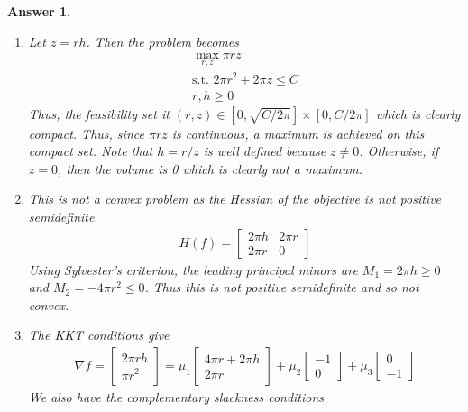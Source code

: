 \documentclass[12pt]{article}
\theoremstyle{colon}
\newtheorem*{answer}{Answer}
\begin{document}
\begin{answer}
  \leavevmode
  \begin{enumerate}[label=\arabic*)]
    \item Let $z=rh$. Then the problem becomes
      \begin{gather*}
        \max_{r,z} \pi r z \\
        \text{s.t. } 2 \pi r^2 + 2 \pi z \leq C \\
        r, h \geq 0
      \end{gather*}
      Thus, the feasibility set it $(r,z) \in [0, \sqrt{C/2 \pi}] \times [0, C/2 \pi]$ which is clearly compact. Thus, since $\pi r z$ is continuous, a maximum is achieved on this compact set. Note that $h = r/z$ is well defined because $z \neq 0$. Otherwise, if $z=0$, then the volume is 0 which is clearly not a maximum.
    \item This is not a convex problem as the Hessian of the objective is not positive semidefinite
      \begin{gather*}
        H(f) = \begin{bmatrix}
          2 \pi h & 2 \pi r \\
          2 \pi r & 0
        \end{bmatrix}
      \end{gather*}
      Using Sylvester's criterion, the leading principal minors are $M_1 = 2 \pi h \geq 0$ and $M_2 = -4 \pi r^2 \leq 0$. Thus this is not positive semidefinite and so not convex.
    \item The KKT conditions give
      \begin{gather*}
        \nabla f = \begin{bmatrix}
          2 \pi r h \\
          \pi r^2
        \end{bmatrix} = \mu_1 \begin{bmatrix}
          4 \pi r + 2 \pi h  \\
          2 \pi r
        \end{bmatrix} + \mu_2 \begin{bmatrix}
          -1  \\
          0
        \end{bmatrix} + \mu_3 \begin{bmatrix}
          0  \\
          -1
        \end{bmatrix}
      \end{gather*}
      We also have the complementary slackness conditions

\end{enumerate}
\end{answer}
\end{document}
